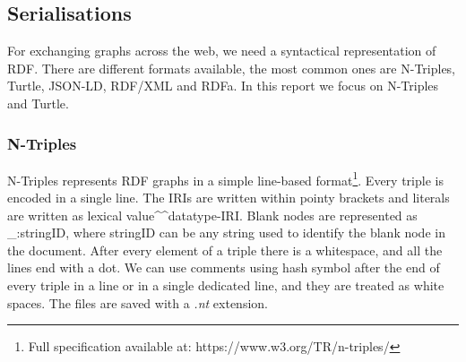 \documentclass[12 pt, a4paper]{report}
\theoremstyle{definition}
\begin{document}


\subsection{Serialisations}
For exchanging graphs across the web, we need a syntactical representation of RDF. There are different formats available, the most common ones are N-Triples, Turtle, JSON-LD, RDF/XML and RDFa. In this report we focus on N-Triples and Turtle.

\subsubsection{N-Triples}
N-Triples represents RDF graphs in a simple line-based format\footnote{Full specification available at: https://www.w3.org/TR/n-triples/}. Every triple is encoded in a single line. The IRIs are written within pointy brackets and literals are written as lexical value\textasciicircum \textasciicircum datatype-IRI. Blank nodes are represented as \_:stringID, where stringID can be any string used to identify the blank node in the document. After every element of a triple there is a whitespace, and all the lines end with a dot. We can use comments using hash symbol after the end of every triple in a line or in a single dedicated line, and they are treated as white spaces. The files are saved with a \textit{.nt} extension.
\end{document}
